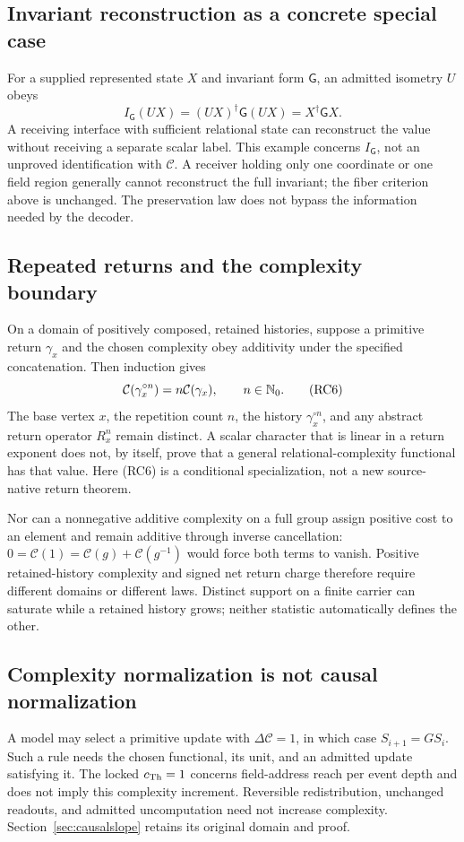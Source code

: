 \subsection*{Invariant reconstruction as a concrete special case}
For a supplied represented state $X$ and invariant form $\mathsf G$, an admitted isometry $U$ obeys
\[
I_{\mathsf G}(UX)=(UX)^\dagger\mathsf G(UX)=X^\dagger\mathsf G X.
\]
A receiving interface with sufficient relational state can reconstruct the value without receiving a separate scalar label. This example concerns $I_{\mathsf G}$, not an unproved identification with $\mathcal C$. A receiver holding only one coordinate or one field region generally cannot reconstruct the full invariant; the fiber criterion above is unchanged. The preservation law does not bypass the information needed by the decoder.

\subsection*{Repeated returns and the complexity boundary}
On a domain of positively composed, retained histories, suppose a primitive return $\gamma_x$ and the chosen complexity obey additivity under the specified concatenation. Then induction gives
\begin{equation}
\mathcal C(\gamma_x^{\circ n})=n\mathcal C(\gamma_x),
\qquad n\in\mathbb N_0.
\tag{RC6}\label{eq:returncomplexity}
\end{equation}
The base vertex $x$, the repetition count $n$, the history $\gamma_x^{\circ n}$, and any abstract return operator $R_x^n$ remain distinct. A scalar character that is linear in a return exponent does not, by itself, prove that a general relational-complexity functional has that value. Here (RC6) is a conditional specialization, not a new source-native return theorem.

Nor can a nonnegative additive complexity on a full group assign positive cost to an element and remain additive through inverse cancellation: $0=\mathcal C(1)=\mathcal C(g)+\mathcal C(g^{-1})$ would force both terms to vanish. Positive retained-history complexity and signed net return charge therefore require different domains or different laws. Distinct support on a finite carrier can saturate while a retained history grows; neither statistic automatically defines the other.

\subsection*{Complexity normalization is not causal normalization}
A model may select a primitive update with $\Delta\mathcal C=1$, in which case $S_{i+1}=GS_i$. Such a rule needs the chosen functional, its unit, and an admitted update satisfying it. The locked $c_{\mathrm{Th}}=1$ concerns field-address reach per event depth and does not imply this complexity increment. Reversible redistribution, unchanged readouts, and admitted uncomputation need not increase complexity. Section~\ref{sec:causalslope} retains its original domain and proof.
\endgroup
\setcounter{section}{11}
